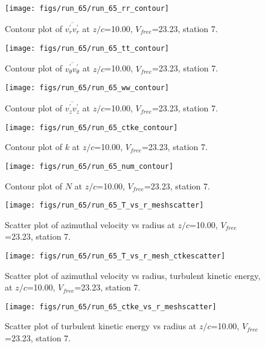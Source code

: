 \begin{figure}[H]
\centering
\texttt{[image: figs/run\_65/run\_65\_rr\_contour]}
\caption{Contour plot of $\overline{v_{r}^{\prime} v_{r}^{\prime}}$ at $z/c$=10.00, $V_{free}$=23.23, station 7.}
\end{figure}


\begin{figure}[H]
\centering
\texttt{[image: figs/run\_65/run\_65\_tt\_contour]}
\caption{Contour plot of $\overline{v_{\theta}^{\prime} v_{\theta}^{\prime}}$ at $z/c$=10.00, $V_{free}$=23.23, station 7.}
\end{figure}


\begin{figure}[H]
\centering
\texttt{[image: figs/run\_65/run\_65\_ww\_contour]}
\caption{Contour plot of $\overline{v_{z}^{\prime} v_{z}^{\prime}}$ at $z/c$=10.00, $V_{free}$=23.23, station 7.}
\end{figure}


\begin{figure}[H]
\centering
\texttt{[image: figs/run\_65/run\_65\_ctke\_contour]}
\caption{Contour plot of $k$ at $z/c$=10.00, $V_{free}$=23.23, station 7.}
\end{figure}


\begin{figure}[H]
\centering
\texttt{[image: figs/run\_65/run\_65\_num\_contour]}
\caption{Contour plot of $N$ at $z/c$=10.00, $V_{free}$=23.23, station 7.}
\end{figure}


\begin{figure}[H]
\centering
\texttt{[image: figs/run\_65/run\_65\_T\_vs\_r\_meshscatter]}
\caption{Scatter plot of azimuthal velocity vs radius at $z/c$=10.00, $V_{free}$=23.23, station 7.}
\end{figure}


\begin{figure}[H]
\centering
\texttt{[image: figs/run\_65/run\_65\_T\_vs\_r\_mesh\_ctkescatter]}
\caption{Scatter plot of azimuthal velocity vs radius, turbulent kinetic energy, at $z/c$=10.00, $V_{free}$=23.23, station 7.}
\end{figure}


\begin{figure}[H]
\centering
\texttt{[image: figs/run\_65/run\_65\_ctke\_vs\_r\_meshscatter]}
\caption{Scatter plot of turbulent kinetic energy vs radius at $z/c$=10.00, $V_{free}$=23.23, station 7.}
\end{figure}


